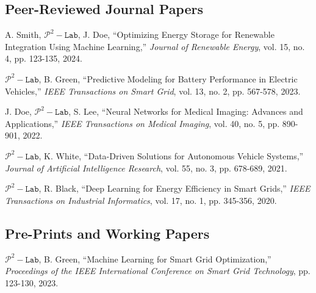 \documentclass[a4paper,11pt]{article}
\begin{document}
\subsection{Peer-Reviewed Journal Papers}
\begin{etaremune}[leftmargin=1cm,itemsep=0cm]
\renewcommand\labelenumi{[J\theenumi]}

\item A. Smith, \textbf{$\mathcal{P}^2-\texttt{Lab}$}, J. Doe, ``Optimizing Energy Storage for Renewable Integration Using Machine Learning,'' \textit{Journal of Renewable Energy}, vol. 15, no. 4, pp. 123-135, 2024.

\item \textbf{$\mathcal{P}^2-\texttt{Lab}$}, B. Green, ``Predictive Modeling for Battery Performance in Electric Vehicles,'' \textit{IEEE Transactions on Smart Grid}, vol. 13, no. 2, pp. 567-578, 2023.

\item J. Doe, \textbf{$\mathcal{P}^2-\texttt{Lab}$}, S. Lee, ``Neural Networks for Medical Imaging: Advances and Applications,'' \textit{IEEE Transactions on Medical Imaging}, vol. 40, no. 5, pp. 890-901, 2022.

\item \textbf{$\mathcal{P}^2-\texttt{Lab}$}, K. White, ``Data-Driven Solutions for Autonomous Vehicle Systems,'' \textit{Journal of Artificial Intelligence Research}, vol. 55, no. 3, pp. 678-689, 2021.

\item \textbf{$\mathcal{P}^2-\texttt{Lab}$}, R. Black, ``Deep Learning for Energy Efficiency in Smart Grids,'' \textit{IEEE Transactions on Industrial Informatics}, vol. 17, no. 1, pp. 345-356, 2020.
\end{etaremune}


\subsection{Pre-Prints and Working Papers}
\begin{etaremune}[leftmargin=1cm,itemsep=0cm]
\renewcommand\labelenumi{[W\theenumi]}

\item \textbf{$\mathcal{P}^2-\texttt{Lab}$}, B. Green, ``Machine Learning for Smart Grid Optimization,'' \textit{Proceedings of the IEEE International Conference on Smart Grid Technology}, pp. 123-130, 2023.

\end{etaremune}
\end{document}
